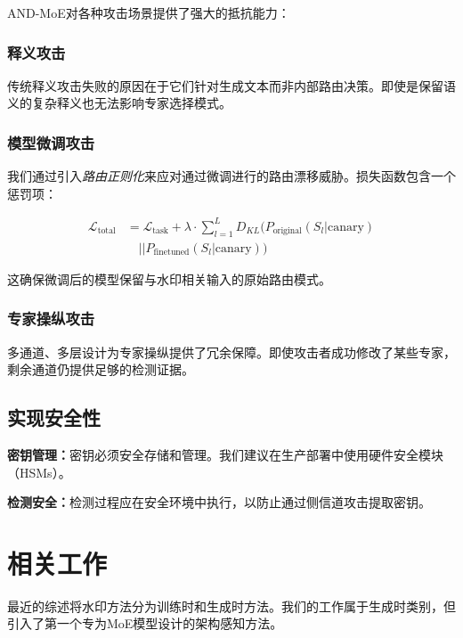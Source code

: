 \documentclass[letterpaper,twocolumn,10pt]{article}
\begin{document}
AND-MoE对各种攻击场景提供了强大的抵抗能力：

\subsubsection{释义攻击}

传统释义攻击失败的原因在于它们针对生成文本而非内部路由决策。即使是保留语义的复杂释义也无法影响专家选择模式。

\subsubsection{模型微调攻击}

我们通过引入\textit{路由正则化}来应对通过微调进行的路由漂移威胁。损失函数包含一个惩罚项：

\begin{align}
\mathcal{L}_{\text{total}} &= \mathcal{L}_{\text{task}} + \lambda \cdot \sum_{l=1}^{L} D_{KL}(P_{\text{original}}(S_l|\text{canary}) \\ 
&\quad || P_{\text{finetuned}}(S_l|\text{canary}))
\end{align}

这确保微调后的模型保留与水印相关输入的原始路由模式。

\subsubsection{专家操纵攻击}

多通道、多层设计为专家操纵提供了冗余保障。即使攻击者成功修改了某些专家，剩余通道仍提供足够的检测证据。

\subsection{实现安全性}

\textbf{密钥管理：}密钥必须安全存储和管理。我们建议在生产部署中使用硬件安全模块（HSMs）。

\textbf{检测安全：}检测过程应在安全环境中执行，以防止通过侧信道攻击提取密钥。

\section{相关工作}

最近的综述\cite{christ2023watermarking,li2023survey}将水印方法分为训练时和生成时方法。我们的工作属于生成时类别，但引入了第一个专为MoE模型设计的架构感知方法。
\end{document}
